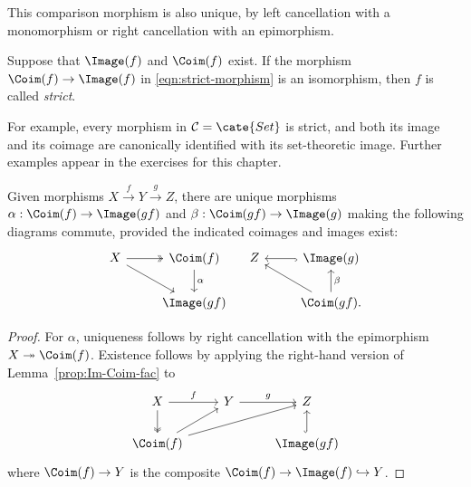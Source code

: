 This comparison morphism is also unique, by left cancellation with a monomorphism or right cancellation with an epimorphism.

\begin{definition}\label{def:strict-morphism}
	Suppose that $\Image(f)$ and $\Coim(f)$ exist. If the morphism $\Coim(f)\to\Image(f)$ in \eqref{eqn:strict-morphism} is an isomorphism, then $f$ is called \emph{strict}.
\end{definition}

For example, every morphism in $\mathcal C=\cate{Set}$ is strict, and both its image and its coimage are canonically identified with its set-theoretic image. Further examples appear in the exercises for this chapter.

\begin{proposition}\label{prop:Images-f-gf}
	Given morphisms $X\xrightarrow{f}Y\xrightarrow{g}Z$, there are unique morphisms $\alpha:\Coim(f)\to\Image(gf)$ and $\beta:\Coim(gf)\to\Image(g)$ making the following diagrams commute, provided the indicated coimages and images exist:
	\[\begin{tikzcd}
		X \arrow[twoheadrightarrow, r] \arrow[rd] & \Coim(f) \arrow[d, "\alpha"] \\
		& \Image(gf)
	\end{tikzcd} \quad \begin{tikzcd}
		Z & \Image(g) \arrow[hookrightarrow, l] \\
		& \Coim(gf) \arrow[u, "\beta"'] \arrow[lu].
	\end{tikzcd}\]
\end{proposition}

\begin{proof}
	For $\alpha$, uniqueness follows by right cancellation with the epimorphism $X\twoheadrightarrow\Coim(f)$. Existence follows by applying the right-hand version of Lemma~\ref{prop:Im-Coim-fac} to
	\[\begin{tikzcd}
		X \arrow[r, "f"] \arrow[twoheadrightarrow, d] & Y \arrow[r, "g"] & Z \\
		\Coim(f) \arrow[ru] \arrow[rru] & & \Image(gf) \arrow[hookrightarrow, u]
	\end{tikzcd}\]
	where $\Coim(f)\to Y$ is the composite $\Coim(f)\to\Image(f)\hookrightarrow Y$.
\end{proof}


